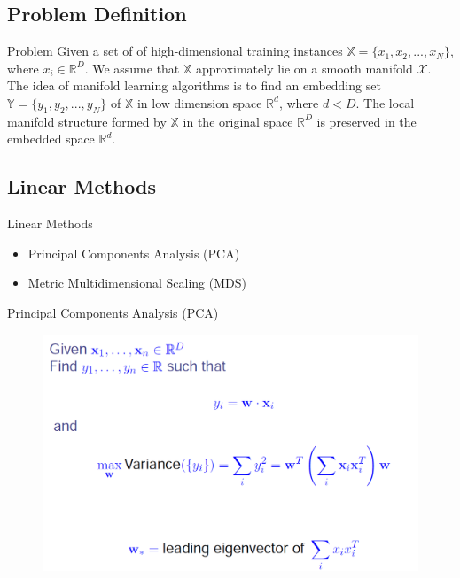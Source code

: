 \documentclass{beamer}
\theoremstyle{plain}
\theoremstyle{definition}
\theoremstyle{plain}
\theoremstyle{plain}
\begin{document}
\subsection{Problem Definition}
\begin{frame}{Problem}
Given a set of of high-dimensional training instances $\mathbb{X} = \{x_1, x_2, ...,x_N \}$, where $x_{i} \in \mathbb{R}^D$. We assume that $\mathbb{X}$ approximately lie on a smooth manifold $\mathcal{X}$. The idea of manifold learning algorithms is to find an embedding set $\mathbb{Y} = \{y_1, y_2, ...,y_N \} $ of $\mathbb{X}$ in low dimension space $\mathbb{R}^d$, where $d<D$. The local manifold structure formed by $\mathbb{X}$ in the original space $\mathbb{R}^D$ is preserved in the embedded space $\mathbb{R}^d$.
\end{frame}
\subsection{Linear Methods}
\begin{frame}{Linear Methods}
\begin{itemize}
\item Principal Components Analysis (PCA)
\item Metric Multidimensional Scaling (MDS)
\end{itemize}
\end{frame}
\begin{frame}{Principal Components Analysis (PCA)}
\begin{figure}[ht]
\begin{center}
\includegraphics[width=\textwidth]{./figures/PCA.png}
\end{center}
\end{figure}

\end{frame}
\end{document}
